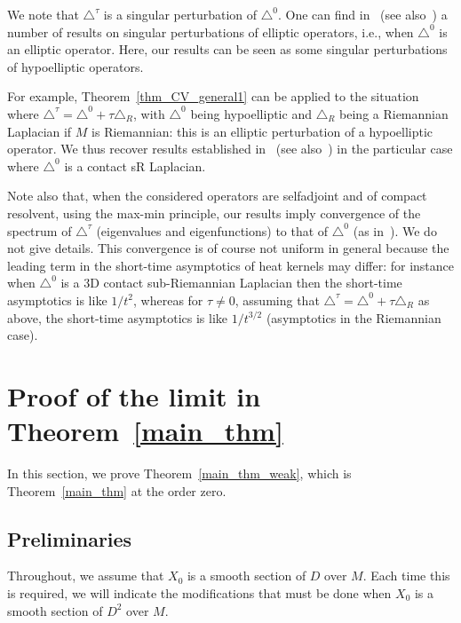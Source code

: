 \documentclass[AHL,Unicode,published]{cedram}
\begin{document}
\begin{rema}
We note that $\triangle^\tau$ is a singular perturbation of $\triangle^0$. One can find in~\cite{Lions_perturbations} (see also~\cite{Huet}) a number of results on singular perturbations of elliptic operators, i.e., when $\triangle^0$ is an elliptic operator. Here, our results can be seen as some singular perturbations of hypoelliptic operators.

For example, Theorem~\ref{thm_CV_general1} can be applied to the situation where $\triangle^\tau = \triangle^0 + \tau \triangle_R$, with $\triangle^0$ being hypoelliptic and $\triangle_R$ being a Riemannian Laplacian if $M$ is Riemannian: this is an elliptic perturbation of a hypoelliptic operator. We thus recover results established in~\cite[Theorem~7.2]{Rumin} (see also~\cite{Ge}) in the particular case where $\triangle^0$ is a contact sR Laplacian.

Note also that, when the considered operators are selfadjoint and of compact resolvent, using the max-min principle, our results imply convergence of the spectrum of $\triangle^\tau$ (eigenvalues and eigenfunctions) to that of $\triangle^0$ (as in~\cite{Fukaya,Ge,Rumin}). We do not give details. This convergence is of course not uniform in general because the leading term in the short-time asymptotics of heat kernels may differ: for instance when $\triangle^0$ is a 3D contact sub-Riemannian Laplacian then the short-time asymptotics is like $1/t^2$, whereas for $\tau\neq 0$, assuming that $\triangle^\tau = \triangle^0 + \tau \triangle_R$ as above, the short-time asymptotics is like $1/t^{3/2}$ (asymptotics in the Riemannian case).
\end{rema}



\section{Proof of the limit in Theorem~\ref{main_thm}}\label{sec:proof_main_thm_prelim}
In this section, we prove Theorem~\ref{main_thm_weak}, which is Theorem~\ref{main_thm} at the order zero.


\subsection{Preliminaries}
Throughout, we assume that $X_0$ is a smooth section of $D$ over $M$. Each time this is required, we will indicate the modifications that must be done when $X_0$ is a smooth section of $D^2$ over $M$.
\end{document}
